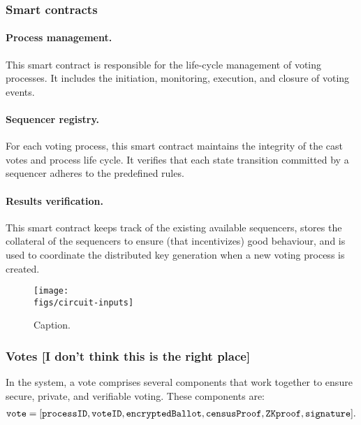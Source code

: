 \subsubsection{Smart contracts}

\paragraph{Process management.} This smart contract is responsible for the life-cycle management of voting processes. It includes the initiation, monitoring, execution, and closure of voting events.

\paragraph{Sequencer registry.} For each voting process, this smart contract maintains the integrity of the cast votes and process life cycle. It verifies that each state transition committed by a sequencer adheres to the predefined rules.

\paragraph{Results verification.} This smart contract keeps track of the existing available sequencers, stores the collateral of the sequencers to ensure (that incentivizes) good behaviour, and is used to coordinate the distributed key generation when a new voting process is created.\\



\begin{figure}[h]
	\centerline{\texttt{[image: \\figs/circuit-inputs]}}
	\caption{Caption.}
	\label{fig:circuit-inputs}
\end{figure}


\subsubsection{Votes [I don't think this is the right place]}

In the \davinci system, a vote comprises several components that work together to ensure secure, private, and verifiable voting. These components are:
\begin{align*}
		\texttt{vote} = [	\texttt{processID}, \texttt{voteID}, \texttt{encryptedBallot}, \texttt{censusProof}, \texttt{ZKproof}, \texttt{signature} ].
\end{align*}

